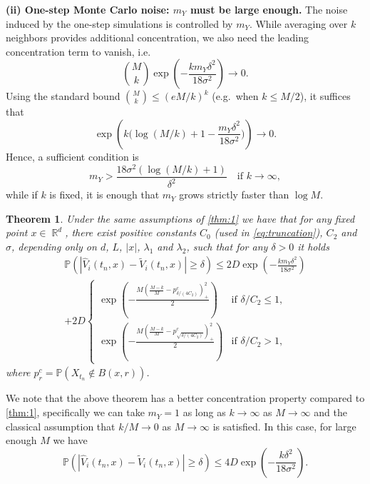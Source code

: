 \documentclass[11pt,reqno,a4paper]{amsart}
\newtheorem{theorem}{Theorem}[section]
\theoremstyle{definition}
\numberwithin{equation}{section}
\renewcommand{\P}{\mathbb{P}}
\DeclareMathOperator{\R}{\mathbb{R}}
\DeclareMathOperator{\1}{\mathbbm{1}}
\begin{document}
\medskip
\noindent\textbf{(ii) One-step Monte Carlo noise: $m_Y$ must be large enough.}
The noise induced by the one-step simulations is controlled by $m_Y$. While averaging over $k$ neighbors provides additional concentration, we also need the leading concentration term to vanish, i.e.
\begin{equation*}
  {\binom{M}{k}} \exp\!\left(-\frac{k m_Y\delta^2}{18 \sigma^2}\right)\to 0.
\end{equation*}
Using the standard bound ${\binom{M}{k}} \le (eM/k)^k$ (e.g.\ when $k\le M/2$), it suffices that
\begin{equation*}
  \exp\!\left(k\Big(\log(M/k)+1-\frac{m_Y\delta^2}{18\sigma^2}\Big)\right)\to 0.
\end{equation*}
Hence, a sufficient condition is
\begin{equation*}
  m_Y > \frac{18\sigma^2(\log(M/k)+1)}{\delta^2}\quad \text{if }k\to\infty,
\end{equation*}
while if $k$ is fixed, it is enough that $m_Y$ grows strictly faster than $\log M$.


\begin{theorem} \label{thm:2}
  Under the same assumptions of \cref{thm:1} we have that for any fixed point $x \in \R^d$, there exist positive constants $C_0$ (used in \cref{eq:truncation}), $C_2$ and $\sigma$, depending only on $d$, $L$, $|x|$, $\lambda_1$ and $\lambda_2$, such that for any $\delta > 0$ it holds
  \begin{multline*}
    \P (|\widehat{V}_i(t_n,x) - \widetilde{V}_i(t_n,x)| \geq \delta)
    \leq 2D \exp \left (-\frac{k m_Y\delta^2}{18 \sigma^2} \right )
    \\
    +
    2D
    \begin{cases}
      \exp \left (-\frac{M \left (\frac{M-k}{M} - p_{\delta/(4 C_2)}^c \right )_+^2}{2} \right )        & \text{if } \delta/C_2 \leq 1,
      \\
      \exp \left (-\frac{M \left (\frac{M-k}{M} - p_{\sqrt{\delta/(4 C_2)}}^c \right )_+^2}{2} \right ) & \text{if } \delta/C_2 > 1,
    \end{cases}
  \end{multline*}
  where $p_{r}^c = \P(X_{t_n} \not \in B(x,r))$.
\end{theorem}

We note that the above theorem has a better concentration property compared to \cref{thm:1}, specifically we can take $m_Y = 1$ as long as $k \to \infty$ as $M \to \infty$ and the classical assumption that $k/M \to 0$ as $M \to \infty$ is satisfied. In this case, for large enough $M$ we have
\begin{equation*}
  \P (|\widehat{V}_i(t_n,x) - \widetilde{V}_i(t_n,x)| \geq \delta) \leq 4D \exp \left (-\frac{k \delta^2}{18 \sigma^2} \right ).
\end{equation*}
\end{document}
